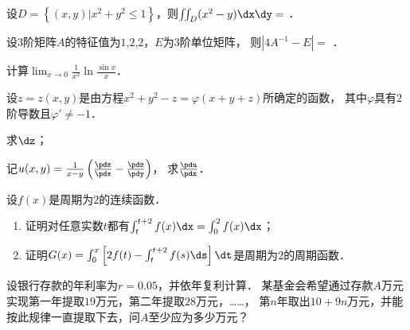 \documentclass[plain,noanswer,medmath]{../../template/jnuexam}
\begin{document}
\begin{problem}
设$D = \left\{(x,y)|x^2 + y^2 \le 1 \right\}$，则$\iint_D (x^2 - y)\dx\dy =$ \fillin{}．
\end{problem}




\begin{problem}
设$3$阶矩阵$A$的特征值为$1$,$2$,$2$，$E$为$3$阶单位矩阵，
则$\left| 4A^{-1} - E \right| =$ \fillin{}．
\end{problem}






\begin{problem}[points=9]
计算$\lim_{x \to 0} \frac{1}{x^2}\ln \frac{\sin x}{x}$．
\end{problem}


\begin{problem}[points=10]
设$z = z$$(x,y)$是由方程$x^2 + y^2 - z = \varphi(x + y + z)$所确定的函数，
其中$\varphi$具有$2$阶导数且$\varphi' \ne -1$．\par
\begin{enumerate*}
\item 求$\dz$；
\item 记$u(x,y) = \frac{1}{x-y}\left(\frac{\pdz}{\pdx}-\frac{\pdz}{\pdy}\right)$，
      求$\frac{\pdu}{\pdx}$．
\end{enumerate*}
\end{problem}




\begin{problem}[points=10]%
设$f(x)$是周期为$2$的连续函数．
\begin{enumerate}
\item 证明对任意实数$t$都有$\int_t^{t + 2} f(x)\dx = \int_0^2 f(x)\dx$；
\item 证明$G(x) = \int_0^x \left[2f(t) - \int_t^{t + 2} f(s)\ds \right]\dt$是周期为$2$的周期函数．
\end{enumerate}
\end{problem}


\begin{problem}[points=10]
设银行存款的年利率为$r = 0.05$，并依年复利计算．
某基金会希望通过存款$A$万元实现第一年提取$19$万元，第二年提取$28$万元，……，
第$n$年取出$10 + 9n$万元，并能按此规律一直提取下去，问$A$至少应为多少万元？
\end{problem}








\end{document}

